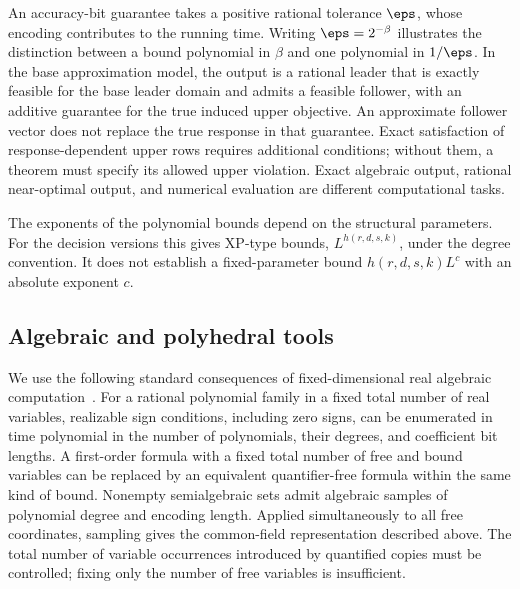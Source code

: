 An accuracy-bit guarantee takes a positive rational tolerance $\eps$,
whose encoding contributes to the running time. Writing $\eps=2^{-\beta}$
illustrates the distinction between a bound polynomial in $\beta$ and
one polynomial in $1/\eps$. In the base approximation model, the output
is a rational leader that is exactly feasible for the base leader domain
and admits a feasible follower, with an additive guarantee for the true
induced upper objective. An approximate follower vector does not replace
the true response in that guarantee. Exact satisfaction of
response-dependent upper rows requires additional conditions; without
them, a theorem must specify its allowed upper violation. Exact
algebraic output, rational near-optimal output, and numerical evaluation
are different computational tasks.

The exponents of the polynomial bounds depend on the structural
parameters. For the decision versions this gives XP-type bounds,
$L^{h(r,d,s,k)}$, under the degree convention. It does not establish a
fixed-parameter bound $h(r,d,s,k)L^c$ with an absolute exponent $c$.

\subsection{Algebraic and polyhedral tools}\label{subsec:tools}

We use the following standard consequences of fixed-dimensional real
algebraic computation~\cite[Theorem 1.3.1 and Section 3.1.3]{BasuPollackRoy1996}.
For a rational polynomial family in a fixed total number of real
variables, realizable sign conditions, including zero signs, can be
enumerated in time polynomial in the number of polynomials, their degrees,
and coefficient bit lengths. A first-order formula with a fixed total
number of free and bound variables can be replaced by an equivalent
quantifier-free formula within the same kind of bound. Nonempty
semialgebraic sets admit algebraic samples of polynomial degree and
encoding length. Applied simultaneously to all free coordinates, sampling
gives the common-field representation described above. The total number
of variable occurrences introduced by quantified copies must be controlled;
fixing only the number of free variables is insufficient.

